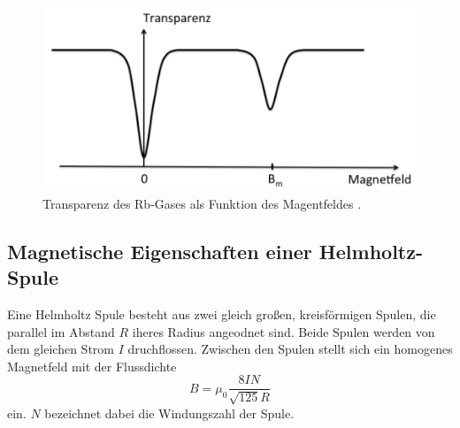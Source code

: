 \begin{figure}[H]
    \centering
    \includegraphics[scale= 0.5]{pictures/TB.png}
    \caption{Transparenz des Rb-Gases als Funktion des Magentfeldes \cite{V21}.}
    \label{fig:TB}
\end{figure}

\subsection{Magnetische Eigenschaften einer Helmholtz-Spule}
Eine Helmholtz Spule besteht aus zwei gleich großen, kreisförmigen 
Spulen, die parallel im Abstand $R$ iheres Radius angeodnet sind. 
Beide Spulen werden von dem gleichen Strom $I$ druchflossen. Zwischen 
den Spulen stellt sich ein homogenes Magnetfeld mit der Flussdichte
\begin{equation}
    B=\mu_0\frac{8IN}{\sqrt{125}R}
\end{equation}
ein. $N$ bezeichnet dabei die Windungszahl der Spule. 